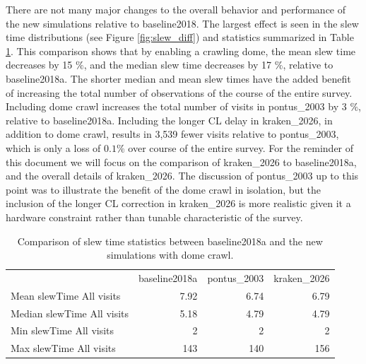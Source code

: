 \documentclass[DM,lsstdraft,authoryear,toc]{lsstdoc}
\begin{document}
There are not many major changes to the overall behavior and performance of the new simulations
relative to baseline2018. The largest effect is seen in the slew time distributions (see Figure \ref{fig:slew_diff}) and statistics summarized in
Table \ref{tab:slewtime-comparison}. This comparison shows that by enabling a crawling dome, the mean
slew time decreases by 15 $\%$, and the median slew time decreases by 17 $\%$, relative to baseline2018a. 
The shorter median and mean slew times have the added benefit of increasing the total number of 
observations of the course of the entire survey. Including dome crawl increases the total number of visits in 
pontus\_2003 by 3 $\%$, relative to baseline2018a. Including the longer CL delay in kraken\_2026, in addition to
dome crawl, results in 3,539 fewer visits relative to pontus\_2003, which is only a loss of $0.1\%$ over course of the 
entire survey. For the reminder of this document we will focus on the comparison of kraken\_2026
to baseline2018a, and the overall details of kraken\_2026. The discussion of pontus\_2003 up to this point was to
illustrate the benefit of the dome crawl in isolation, but the inclusion of the longer CL correction in kraken\_2026 is 
more realistic given it a hardware constraint rather than tunable characteristic of the survey. 

\begin{table}[htp]
\caption{Comparison of slew time statistics between baseline2018a and the new simulations with dome crawl.}
\begin{center}
\small
\begin{tabular}{lrrr}
\toprule
{}                                         &   baseline2018a  &   pontus\_2003  &  kraken\_2026 \\
 Mean slewTime All visits    &           7.92          &         6.74          & 6.79               \\
 Median slewTime All visits &          5.18           &        4.79           & 4.79               \\
 Min slewTime All visits       &           2               &         2               & 2                     \\
 Max slewTime All visits      &         143             &       140             & 156                 \\
 
\bottomrule
\end{tabular}
\end{center}
\label{tab:slewtime-comparison}
\end{table}
\end{document}

